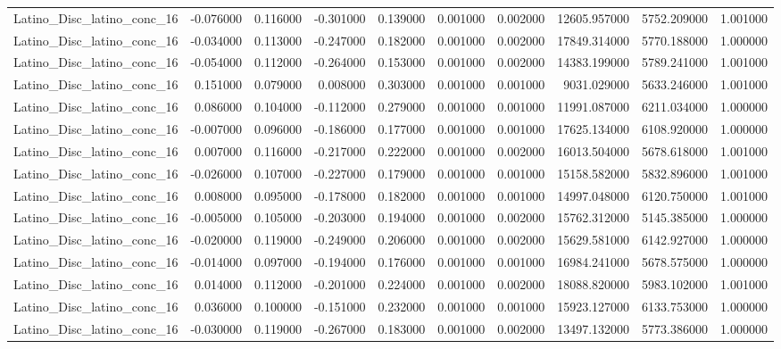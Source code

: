 \begin{table}
\begin{tabular}{lrrrrrrrrr}
Latino_Disc_latino_conc_16 & -0.076000 & 0.116000 & -0.301000 & 0.139000 & 0.001000 & 0.002000 & 12605.957000 & 5752.209000 & 1.001000 \\
Latino_Disc_latino_conc_16 & -0.034000 & 0.113000 & -0.247000 & 0.182000 & 0.001000 & 0.002000 & 17849.314000 & 5770.188000 & 1.000000 \\
Latino_Disc_latino_conc_16 & -0.054000 & 0.112000 & -0.264000 & 0.153000 & 0.001000 & 0.002000 & 14383.199000 & 5789.241000 & 1.001000 \\
Latino_Disc_latino_conc_16 & 0.151000 & 0.079000 & 0.008000 & 0.303000 & 0.001000 & 0.001000 & 9031.029000 & 5633.246000 & 1.001000 \\
Latino_Disc_latino_conc_16 & 0.086000 & 0.104000 & -0.112000 & 0.279000 & 0.001000 & 0.001000 & 11991.087000 & 6211.034000 & 1.000000 \\
Latino_Disc_latino_conc_16 & -0.007000 & 0.096000 & -0.186000 & 0.177000 & 0.001000 & 0.001000 & 17625.134000 & 6108.920000 & 1.000000 \\
Latino_Disc_latino_conc_16 & 0.007000 & 0.116000 & -0.217000 & 0.222000 & 0.001000 & 0.002000 & 16013.504000 & 5678.618000 & 1.001000 \\
Latino_Disc_latino_conc_16 & -0.026000 & 0.107000 & -0.227000 & 0.179000 & 0.001000 & 0.001000 & 15158.582000 & 5832.896000 & 1.001000 \\
Latino_Disc_latino_conc_16 & 0.008000 & 0.095000 & -0.178000 & 0.182000 & 0.001000 & 0.001000 & 14997.048000 & 6120.750000 & 1.001000 \\
Latino_Disc_latino_conc_16 & -0.005000 & 0.105000 & -0.203000 & 0.194000 & 0.001000 & 0.002000 & 15762.312000 & 5145.385000 & 1.000000 \\
Latino_Disc_latino_conc_16 & -0.020000 & 0.119000 & -0.249000 & 0.206000 & 0.001000 & 0.002000 & 15629.581000 & 6142.927000 & 1.000000 \\
Latino_Disc_latino_conc_16 & -0.014000 & 0.097000 & -0.194000 & 0.176000 & 0.001000 & 0.001000 & 16984.241000 & 5678.575000 & 1.000000 \\
Latino_Disc_latino_conc_16 & 0.014000 & 0.112000 & -0.201000 & 0.224000 & 0.001000 & 0.002000 & 18088.820000 & 5983.102000 & 1.001000 \\
Latino_Disc_latino_conc_16 & 0.036000 & 0.100000 & -0.151000 & 0.232000 & 0.001000 & 0.001000 & 15923.127000 & 6133.753000 & 1.000000 \\
Latino_Disc_latino_conc_16 & -0.030000 & 0.119000 & -0.267000 & 0.183000 & 0.001000 & 0.002000 & 13497.132000 & 5773.386000 & 1.000000 \\

\end{tabular}
\end{table}
